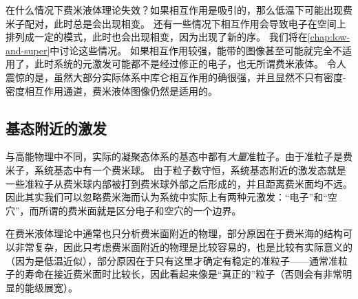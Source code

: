 在什么情况下费米液体理论失效？如果相互作用是吸引的，那么低温下可能出现费米子配对，此时总是会出现相变。
还有一些情况下相互作用会导致电子在空间上排列成一定的模式，此时也会出现相变，因为出现了新的序。
我们将在\autoref{chap:low-and-super}中讨论这些情况。
如果相互作用较强，能带的图像甚至可能就完全不适用了，此时系统的元激发可能都不是经过修正的电子，也无所谓费米液体。
令人震惊的是，虽然大部分实际体系中库仑相互作用的确很强，并且显然不只有密度-密度相互作用通道，费米液体图像仍然是适用的。

\subsection{基态附近的激发}\label{sec:fermi-liquid-ground}

与高能物理中不同，实际的凝聚态体系的基态中都有\emph{大量}准粒子。由于准粒子是费米子，系统基态中有一个费米球。
由于粒子数守恒，系统基态附近的激发态就是一些准粒子从费米球内部被打到费米球外部之后形成的，并且距离费米面均不远。
因此其实我们可以忽略费米海而认为系统中实际上有两种元激发：“电子”和“空穴”，而所谓的费米面就是区分电子和空穴的一个边界。

在费米液体理论中通常也只分析费米面附近的物理，部分原因在于费米海的结构可以非常复杂，因此只考虑费米面附近的物理是比较容易的，也是比较有实际意义的（因为是低温近似），部分原因在于只有这里才确定有稳定的准粒子——通常准粒子的寿命在接近费米面时比较长，因此看起来像是“真正的”粒子（否则会有非常明显的能级展宽）。

